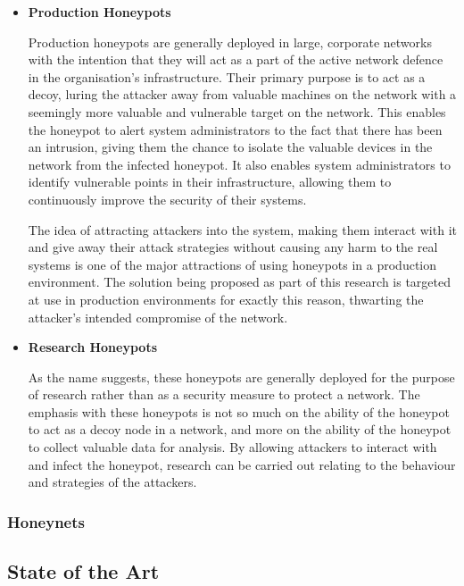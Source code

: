 \begin{itemize}
	\item \textbf{Production Honeypots}
	
	Production honeypots are generally deployed in large, corporate networks with the intention that they will act as a part of the active network defence in the organisation’s infrastructure. Their primary purpose is to act as a decoy, luring the attacker away from valuable machines on the network with a seemingly more valuable and vulnerable target on the network. This enables the honeypot to alert system administrators to the fact that there has been an intrusion, giving them the chance to isolate the valuable devices in the network from the infected honeypot. It also enables system administrators to identify vulnerable points in their infrastructure, allowing them to continuously improve the security of their systems. 
	
	The idea of attracting attackers into the system, making them interact with it and give away their attack strategies without causing any harm to the real systems is one of the major attractions of using honeypots in a production environment. The solution being proposed as part of this research is targeted at use in production environments for exactly this reason, thwarting the attacker’s intended compromise of the network.
	
	
	\item \textbf{Research Honeypots}
	
	As the name suggests, these honeypots are generally deployed for the purpose of research rather than as a security measure to protect a network. The emphasis with these honeypots is not so much on the ability of the honeypot to act as a decoy node in a network, and more on the ability of the honeypot to collect valuable data for analysis. By allowing attackers to interact with and infect the honeypot, research can be carried out relating to the behaviour and strategies of the attackers.
	
\end{itemize}


\subsubsection{Honeynets}

\subsection{State of the Art}

